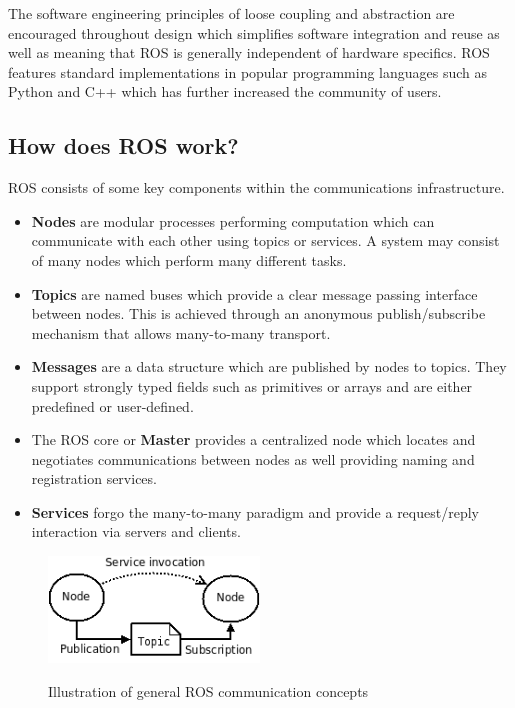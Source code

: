 \documentclass{mproj}
\begin{document}
The software engineering principles of loose coupling and abstraction are encouraged throughout design which simplifies software integration and reuse as well as meaning that ROS is generally independent of hardware specifics. ROS features standard implementations in popular programming languages such as Python and C++ which has further increased the community of users.

\subsection{How does ROS work?}

ROS consists of some key components within the communications infrastructure.
\begin{itemize}
  \item \textbf{Nodes} are modular processes performing computation which can communicate with each other using topics or services. A system may consist of many nodes which perform many different tasks.
  \item \textbf{Topics} are named buses which provide a clear message passing interface between nodes. This is achieved through an anonymous publish/subscribe mechanism that allows many-to-many transport.
  \item \textbf{Messages} are a data structure which are published by nodes to topics. They support strongly typed fields such as primitives or arrays and are either predefined or user-defined.
  \item The ROS core or \textbf{Master} provides a centralized node which locates and negotiates communications between nodes as well providing naming and registration services.
  \item \textbf{Services} forgo the many-to-many paradigm and provide a request/reply interaction via servers and clients.
\end{itemize}

\begin{figure}[h]
  \caption{Illustration of general ROS communication concepts}
  \centering
  \includegraphics[width=0.5\textwidth]{images/ROS_basic_concepts.png}
  \label{fig:ROS diagram}
\end{figure}
\end{document}
